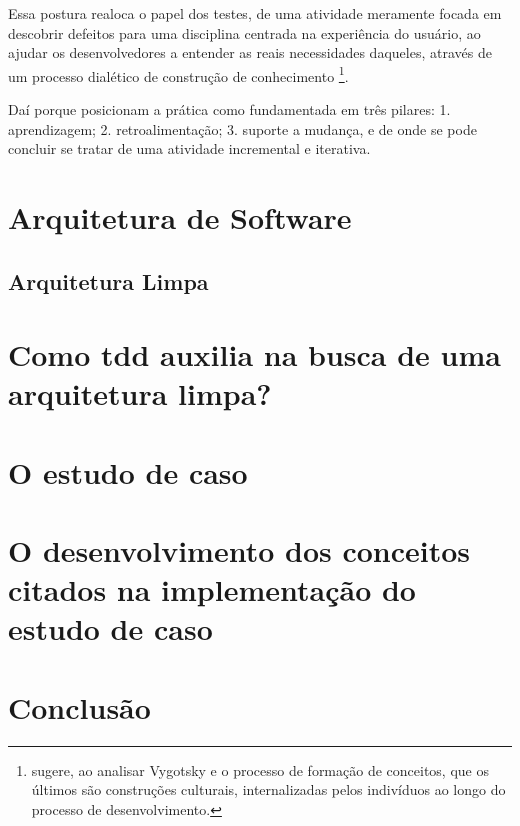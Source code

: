 \documentclass[12pt,a4paper,oneside,english,brazil]{article}
\begin{document}
Essa postura realoca o papel dos testes, de uma atividade meramente focada em
descobrir defeitos para uma disciplina centrada na experiência do usuário, ao
ajudar os desenvolvedores a entender as reais necessidades daqueles, através de
um processo dialético de construção de conhecimento \footnote{
   sugere, ao analisar Vygotsky e o processo de
  formação de conceitos, que os últimos são construções culturais,
  internalizadas pelos indivíduos ao longo do processo de desenvolvimento.
}.

Daí porque  posicionam a prática como
fundamentada em três pilares: 1. aprendizagem; 2. retroalimentação; 3. suporte a
mudança, e de onde se pode concluir se tratar de uma atividade incremental e
iterativa.

\section{Arquitetura de Software}

\subsection{Arquitetura Limpa}

\section{Como tdd auxilia na busca de uma arquitetura limpa?}

\section{O estudo de caso}



\section{
  O desenvolvimento dos conceitos citados na implementação do estudo de caso
}

\section{Conclusão}

\clearpage
\renewcommand\refname{Referências Bibliográficas}


\end{document}
